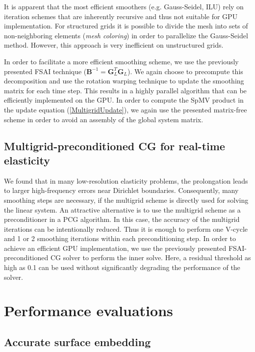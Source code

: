 It is apparent that the most efficient smoothers (e.g. Gauss-Seidel, ILU) rely on iteration schemes that are inherently recursive and thus not suitable for GPU implementation. For structured grids it is possible to divide the mesh into sets of non-neighboring elements (\emph{mesh coloring}) in order to parallelize the Gauss-Seidel method. However, this approach is very inefficient on unstructured grids. 

In order to facilitate a more efficient smoothing scheme, we use the previously presented FSAI technique ($\mathbf B^{-1} = \mathbf{G}_L ^T \mathbf{G}_L$). We again choose to precompute this decomposition and use the rotation warping technique to update the smoothing matrix for each time step. This results in a highly parallel algorithm that can be efficiently implemented on the GPU. In order to compute the SpMV product in the update equation (\ref{MultigridUpdate}), we again use the presented matrix-free scheme in order to avoid an assembly of the global system matrix.

\subsection{Multigrid-preconditioned CG for real-time elasticity}

We found that in many low-resolution elasticity problems, the prolongation leads to larger high-frequency errors near Dirichlet boundaries. Consequently, many smoothing steps are necessary, if the multigrid scheme is directly used for solving the linear system. An attractive alternative is to use the multigrid scheme as a preconditioner in a PCG algorithm. In this case, the accuracy of the multigrid iterations can be intentionally reduced. Thus it is enough to perform one V-cycle and 1 or 2 smoothing iterations within each preconditioning step. In order to achieve an efficient GPU implementation, we use the previously presented FSAI-preconditioned CG solver to perform the inner solve. Here, a residual threshold as high as 0.1 can be used without significantly degrading the performance of the solver. 


\section{Performance evaluations}

\subsection{Accurate surface embedding}

